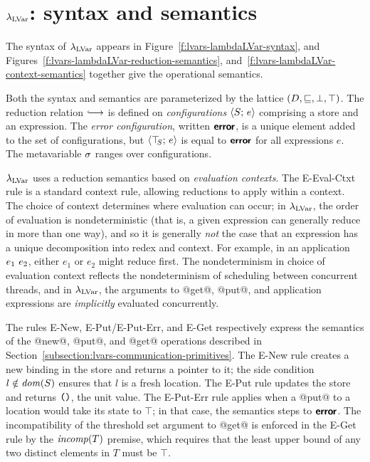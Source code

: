 \section{$\lambda_{\textrm{LVar}}$: syntax and semantics}\label{s:lvars-lambdalvar}

\FigLambdaLVarGrammar

\FigLambdaLVarReductionSemantics

\FigLambdaLVarContextSemantics


The syntax of $\lambda_{\textrm{LVar}}$ appears in
Figure~\ref{f:lvars-lambdaLVar-syntax}, and
Figures~\ref{f:lvars-lambdaLVar-reduction-semantics},
and~\ref{f:lvars-lambdaLVar-context-semantics} together give the
operational semantics.


Both the syntax and semantics are parameterized by the lattice $(D,
\sqsubseteq, \bot, \top)$.  The reduction relation $\parstepsto$ is
defined on \emph{configurations} $\langle S;\, e \rangle$ comprising a store
and an expression.  The \emph{error configuration}, written $\textbf{\textsf{error}}$,
is a unique element added to the set of configurations, but
$\langle \top\hspace{-0.85mm}_{S};\, e \rangle$ is equal to $\textbf{\textsf{error}}$ for all expressions $e$.  The
metavariable $\sigma$ ranges over configurations.

$\lambda_{\textrm{LVar}}$ uses a reduction semantics based on \emph{evaluation
  contexts}.  The {\sc E-Eval-Ctxt} rule is a standard context rule,
allowing reductions to apply within a context.  The choice of context
determines where evaluation can occur; in $\lambda_{\textrm{LVar}}$, the order of
evaluation is nondeterministic (that is, a given expression can
generally reduce in more than one way), and so it is generally
\emph{not} the case that an expression has a unique decomposition into
redex and context.  For example, in an application $e_1~e_2$,
either $e_1$ or $e_2$ might reduce first.  The nondeterminism in
choice of evaluation context reflects the nondeterminism of scheduling
between concurrent threads, and in $\lambda_{\textrm{LVar}}$, the arguments to
@get@, @put@, and application expressions are \emph{implicitly}
evaluated concurrently.

The rules {\sc E-New}, {\sc E-Put}/{\sc E-Put-Err}, and {\sc E-Get}
respectively express the semantics of the @new@, @put@, and @get@
operations described in
Section~\ref{subsection:lvars-communication-primitives}.  The {\sc
  E-New} rule creates a new binding in the store and returns a pointer
to it; the side condition $l \notin \mathit{dom}(S)$ ensures that $l$ is a
fresh location.  The {\sc E-Put} rule updates the store and returns
$\mbox{\texttt{()}}$, the unit value.  The {\sc E-Put-Err} rule applies when a
@put@ to a location would take its state to $\top$; in that case, the
semantics steps to $\textbf{\textsf{error}}$.  The incompatibility of the threshold set
argument to @get@ is enforced in the {\sc E-Get} rule by the
$\mathit{incomp}(T)$ premise, which requires that the least upper bound of any
two distinct elements in $T$ must be $\top$.

